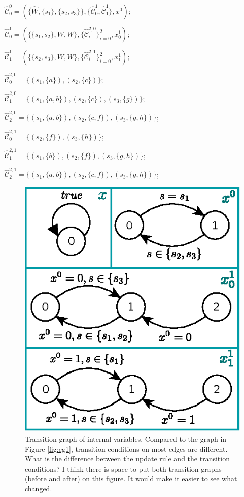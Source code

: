 $ \widehat{\mathcal{C}}^0_0 = (\{\widehat{W},\{s_1\},\{s_2,s_3\}\},\{\widehat{\mathcal{C}}^1_0, \widehat{\mathcal{C}}^1_1\},x^0) $;

$ \widehat{\mathcal{C}}^1_0 = (\{\{s_1,s_2\},W,W\},\{\widehat{\mathcal{C}}^{2,0}_i\}_{i=0}^2, x^1_0)$;

$ \widehat{\mathcal{C}}^1_1 = (\{\{s_2,s_3\},W,W\},\{\widehat{\mathcal{C}}^{2,1}_i\}_{i=0}^{2}, x^1_1)$;

$ \widehat{\mathcal{C}}^{2,0}_0 = \{(s_1,\{a\}),(s_2,\{c\})\} $;

$ \widehat{\mathcal{C}}^{2,0}_1 = \{(s_1,\{a,b\}),(s_2,\{c\}),(s_3,\{g\})\} $;

$ \widehat{\mathcal{C}}^{2,0}_2 = \{(s_1,\{a,b\}),(s_2,\{c,f\}),(s_3,\{g,h\})\} $; 

$ \widehat{\mathcal{C}}^{2,1}_0 = \{(s_2,\{f\}),(s_3,\{h\})\} $;

$ \widehat{\mathcal{C}}^{2,1}_1 = \{(s_1,\{b\}),(s_2,\{f\}), (s_3,\{g,h\})\} $;

$ \widehat{\mathcal{C}}^{2,1}_2 = \{(s_1,\{a,b\}),(s_2,\{c,f\}),(s_3,\{g,h\})\} $;

\begin{figure}
	\centering
	\includegraphics[width=0.7\linewidth]{pic/xupdate2}
	\caption{ Transition graph of internal variables. Compared to the graph in Figure \ref{fig:eg1}, transition conditions on most edges are different. {\color{purple} What is the difference between the update rule and the transition conditions? I think there is space to put both transition graphs (before and after) on this figure. It would make it easier to see what changed.}}
	\label{fig:xupdate2}
\end{figure}

